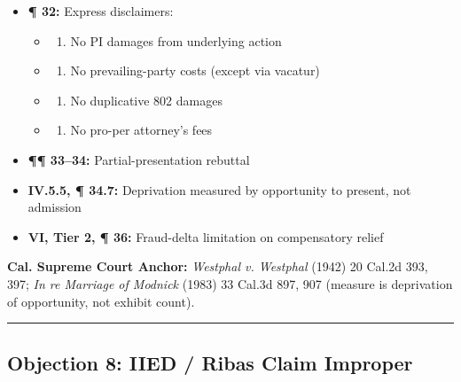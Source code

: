 \begin{itemize}
\tightlist
\item
  \textbf{¶ 32:} Express disclaimers:

  \begin{itemize}
  \tightlist
  \item
    \begin{enumerate}
    \def\labelenumi{(\alph{enumi})}
    \tightlist
    \item
      No PI damages from underlying action
    \end{enumerate}
  \item
    \begin{enumerate}
    \def\labelenumi{(\alph{enumi})}
    \setcounter{enumi}{1}
    \tightlist
    \item
      No prevailing-party costs (except via vacatur)
    \end{enumerate}
  \item
    \begin{enumerate}
    \def\labelenumi{(\alph{enumi})}
    \setcounter{enumi}{2}
    \tightlist
    \item
      No duplicative 802 damages
    \end{enumerate}
  \item
    \begin{enumerate}
    \def\labelenumi{(\alph{enumi})}
    \setcounter{enumi}{3}
    \tightlist
    \item
      No pro-per attorney's fees
    \end{enumerate}
  \end{itemize}
\item
  \textbf{¶¶ 33--34:} Partial-presentation rebuttal
\item
  \textbf{\textsection{}IV.5.5, ¶ 34.7:} Deprivation measured by opportunity to present, not admission
\item
  \textbf{\textsection{}VI, Tier 2, ¶ 36:} Fraud-delta limitation on compensatory relief
\end{itemize}

\textbf{Cal. Supreme Court Anchor:} \emph{Westphal v. Westphal} (1942) 20 Cal.2d 393, 397; \emph{In re Marriage of Modnick} (1983) 33 Cal.3d 897, 907 (measure is deprivation of opportunity, not exhibit count).

\begin{center}\rule{0.5\linewidth}{0.5pt}\end{center}

\subsection{Objection 8: IIED / Ribas Claim Improper}\label{objection-8-iied-ribas-claim-improper}


